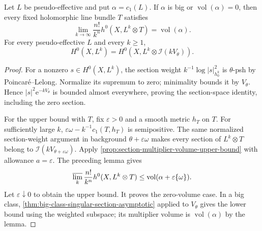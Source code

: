 \begin{corollary}\label{cor:big-or-zero-line-bundle-volume}
Let $L$ be pseudo-effective and put $\alpha=c_1(L)$. If $\alpha$ is big or $\operatorname{vol}(\alpha)=0$, then every fixed holomorphic line bundle $T$ satisfies
\[
 \lim_{k\to\infty}\frac{n!}{k^n}h^0(X,L^k\otimes T)
       =\operatorname{vol}(\alpha).
\]
For every pseudo-effective $L$ and every $k\geq1$,
\[
 H^0(X,L^k)=H^0(X,L^k\otimes\mathcal I(kV_\theta)).
\]
\end{corollary}
\begin{proof}
For a nonzero $s\in H^0(X,L^k)$, the section weight $k^{-1}\log|s|_{h_0^k}^2$ is $\theta$-psh by Poincar\'e--Lelong. Normalize its supremum to zero; minimality bounds it by $V_\theta$. Hence $|s|^2\mathrm e^{-kV_\theta}$ is bounded almost everywhere, proving the section-space identity, including the zero section.

For the upper bound with $T$, fix $\varepsilon>0$ and a smooth metric $h_T$ on $T$. For sufficiently large $k$, $\varepsilon\omega-k^{-1}c_1(T,h_T)$ is semipositive. The same normalized section-weight argument in background $\theta+\varepsilon\omega$ makes every section of $L^k\otimes T$ belong to $\mathcal I(kV_{\theta+\varepsilon\omega})$. Apply \cref{prop:section-multiplier-volume-upper-bound} with allowance $a=\varepsilon$. The preceding lemma gives
\[
 \varlimsup_k\frac{n!}{k^n}h^0(X,L^k\otimes T)
   \leq\operatorname{vol}(\alpha+\varepsilon\{\omega\}).
\]
Let $\varepsilon\downarrow0$ to obtain the upper bound. It proves the zero-volume case. In a big class, \cref{thm:big-class-singular-section-asymptotic} applied to $V_\theta$ gives the lower bound using the weighted subspace; its multiplier volume is $\operatorname{vol}(\alpha)$ by the lemma.
\end{proof}

